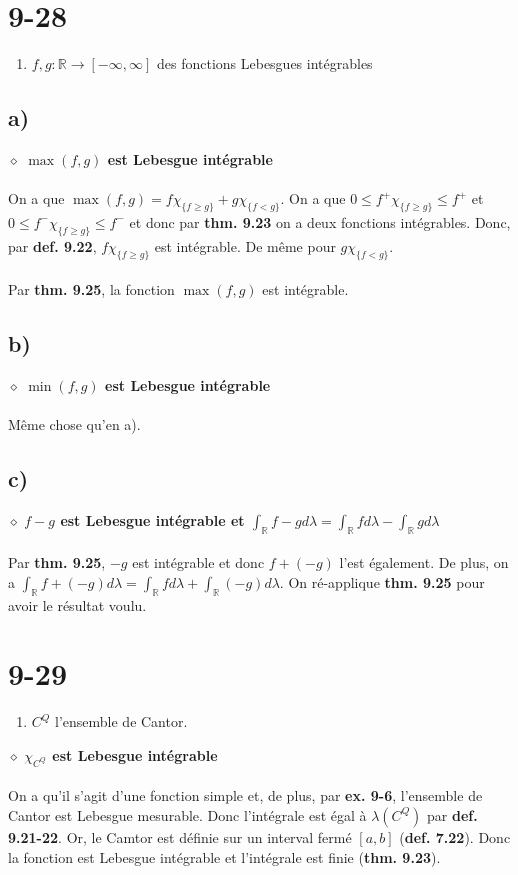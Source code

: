\documentclass[a4paper,10pt]{article}
\begin{document}
\section*{9-28}
\begin{enumerate}
	\item $f,g : \mathbb{R} \rightarrow [-\infty, \infty]$ des fonctions Lebesgues intégrables
\end{enumerate}
\subsection*{a)}
$\diamond$ \textbf{$\max (f,g)$ est Lebesgue intégrable}
\\
\\
On a que $\max (f,g) = f \chi_{\{f \geq g\}} + g \chi_{\{f < g\}}$. On a que $0 \leq f^+ \chi_{\{f \geq g\}} \leq f^+$ et $0 \leq f^- \chi_{\{f \geq g\}} \leq f^-$ et donc par \textbf{thm. 9.23} on a deux fonctions intégrables. Donc, par \textbf{def. 9.22}, $f \chi_{\{f \geq g\}}$ est intégrable. De même pour $g\chi_{\{f < g\}}$.
\\
\\
Par \textbf{thm. 9.25}, la fonction $\max (f,g)$ est intégrable.  

\subsection{b)}
$\diamond$ \textbf{$\min (f,g)$ est Lebesgue intégrable}
\\
\\
Même chose qu'en a).

\subsection*{c)}
$\diamond$ \textbf{$f-g$ est Lebesgue intégrable et $\int_\mathbb{R} f-g d\lambda = \int_\mathbb{R} f d\lambda - \int_\mathbb{R} g d\lambda$}
\\
\\
Par \textbf{thm. 9.25}, $-g$ est intégrable et donc $f + (-g)$ l'est également. De plus, on a $\int_\mathbb{R} f + (-g) d\lambda = \int_\mathbb{R} f d\lambda + \int_\mathbb{R} (-g)d\lambda$. On ré-applique \textbf{thm. 9.25} pour avoir le résultat voulu.

\section*{9-29}
\begin{enumerate}
	\item $C^Q$ l'ensemble de Cantor. 
\end{enumerate}
$\diamond$ \textbf{$\chi_{C^Q}$ est Lebesgue intégrable}
\\
\\
On a qu'il s'agit d'une fonction simple et, de plus, par \textbf{ex. 9-6}, l'ensemble de Cantor est Lebesgue mesurable. Donc l'intégrale est égal à $\lambda (C^Q)$ par \textbf{def. 9.21-22}. Or, le Camtor est définie sur un interval fermé $[a,b]$ (\textbf{def. 7.22}). Donc la fonction est Lebesgue intégrable et l'intégrale est finie (\textbf{thm. 9.23}). 
\end{document}
